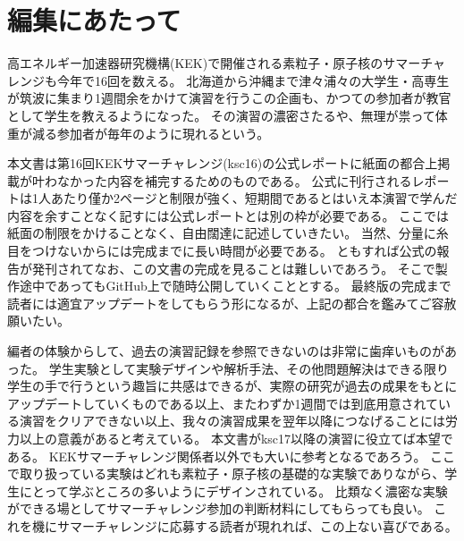 \section*{編集にあたって}

高エネルギー加速器研究機構(KEK)で開催される素粒子・原子核のサマーチャレンジも今年で16回を数える。
北海道から沖縄まで津々浦々の大学生・高専生が筑波に集まり1週間余をかけて演習を行うこの企画も、かつての参加者が教官として学生を教えるようになった。
その演習の濃密さたるや、無理が祟って体重が減る参加者が毎年のように現れるという。

本文書は第16回KEKサマーチャレンジ(ksc16)の公式レポートに紙面の都合上掲載が叶わなかった内容を補完するためのものである。
公式に刊行されるレポートは1人あたり僅か2ページと制限が強く、短期間であるとはいえ本演習で学んだ内容を余すことなく記すには公式レポートとは別の枠が必要である。
ここでは紙面の制限をかけることなく、自由闊達に記述していきたい。
当然、分量に糸目をつけないからには完成までに長い時間が必要である。
ともすれば公式の報告が発刊されてなお、この文書の完成を見ることは難しいであろう。
そこで製作途中であってもGitHub上で随時公開していくこととする。
最終版の完成まで読者には適宜アップデートをしてもらう形になるが、上記の都合を鑑みてご容赦願いたい。

編者の体験からして、過去の演習記録を参照できないのは非常に歯痒いものがあった。
学生実験として実験デザインや解析手法、その他問題解決はできる限り学生の手で行うという趣旨に共感はできるが、実際の研究が過去の成果をもとにアップデートしていくものである以上、またわずか1週間では到底用意されている演習をクリアできない以上、我々の演習成果を翌年以降につなげることには労力以上の意義があると考えている。
本文書がksc17以降の演習に役立てば本望である。
KEKサマーチャレンジ関係者以外でも大いに参考となるであろう。
ここで取り扱っている実験はどれも素粒子・原子核の基礎的な実験でありながら、学生にとって学ぶところの多いようにデザインされている。
比類なく濃密な実験ができる場としてサマーチャレンジ参加の判断材料にしてもらっても良い。
これを機にサマーチャレンジに応募する読者が現れれば、この上ない喜びである。


\rightline{\today}

